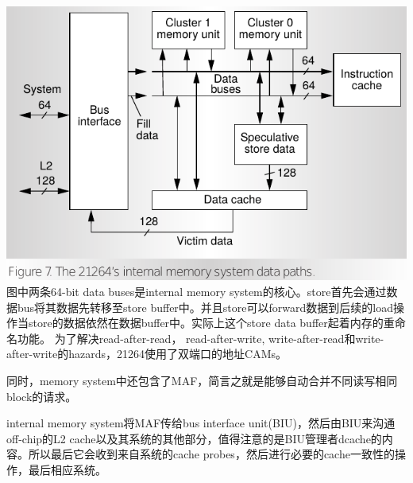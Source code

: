 \documentclass{article}
\newenvironment{commentary}
{ \vspace{-0.1in}
  \begin{quotation}
  \noindent
  \small \em
  \rule{\linewidth}{1pt}\\
}
{
  \end{quotation}
}
\begin{document}
\begin{multicols}{2}
\begin{enumerate}
		\includegraphics[width=\linewidth]{figs/memory.png}
		图中两条64-bit data buses是internal memory system的核心。store首先会通过数据bus将其数据先转移至store buffer中。并且store可以forward数据到后续的load操作当store的数据依然在数据buffer中。实际上这个store data buffer起着内存的重命名功能。
		为了解决read-after-read， read-after-write, write-after-read和write-after-write的hazards，21264使用了双端口的地址CAMs。~\cite{alpha}
		
		同时，memory system中还包含了MAF，简言之就是能够自动合并不同读写相同block的请求。
		
		internal memory system将MAF传给bus interface unit(BIU)，然后由BIU来沟通off-chip的L2 cache以及其系统的其他部分，值得注意的是BIU管理者dcache的内容。所以最后它会收到来自系统的cache probes，然后进行必要的cache一致性的操作，最后相应系统。
			
	\end{enumerate}
	\end{multicols}	
\end{document}
